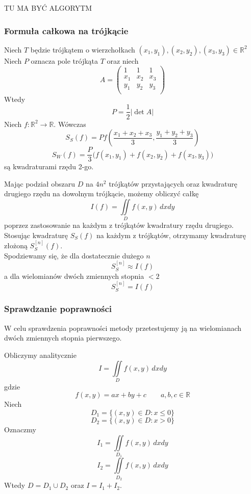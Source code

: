 \documentclass[9pt]{beamer}
\begin{document}
\begin{frame}
    TU MA BYĆ ALGORYTM
\end{frame}


\begin{frame}
    \frametitle{Formuła całkowa na trójkącie}
    Niech $T$ będzie trójkątem o wierzchołkach $(x_1,y_1), (x_2,y_2), (x_3,y_3) \in \mathbb{R}^2$
    Niech $P$ oznacza pole trójkąta $T$ oraz niech 
    $$ A = \begin{pmatrix}
    	1 & 1 & 1 \\
    	x_1 & x_2 & x_3 \\
    	y_1 & y_2 & y_3 \\
    \end{pmatrix} $$
    Wtedy $$P = \frac{1}{2}|\det{A}|$$
    Niech $f : \mathbb{R}^2 \to \mathbb{R}$. Wówczas 
    $$S_S(f) = P f \left(\frac{x_1+x_2+x_3}{3},\frac{y_1+y_2+y_3}{3} \right) $$
    $$S_W(f) = \frac{P}{3} \Big( f(x_1,y_1) + f(x_2,y_2) + f(x_3,y_3) \Big)$$
    są kwadraturami rzędu 2-go.
    
\end{frame}

\begin{frame}
	 \begin{spacing}{1.5}
	Mając podział obszaru $ D $ na $4 n^2 $ trójkątów przystających oraz kwadraturę drugiego rzędu na dowolnym trójkącie, możemy obliczyć całkę $$ I(f) = \iint\limits_D f(x,y)  \, dxdy $$ poprzez zastosowanie na każdym z trójkątów kwadratury rzędu drugiego.\\
	
	Stosując kwadraturę $ S_S(f) $ na każdym z trójkątów, 
	otrzymamy kwadraturę złożoną $ S_S^{[n]}(f) $.\\
	
	Spodziewamy się, że dla dostatecznie dużego $ n $
	$$ S_S^{[n]} \approx I(f) $$	
	a dla wielomianów dwóch zmiennych stopnia $ < 2 $
	$$ S_S^{[n]} = I(f) $$ 

	\end{spacing}
\end{frame}

\begin{frame}
\frametitle{Sprawdzanie poprawności}

    \begin{spacing}{1}
        W celu sprawdzenia poprawności metody przetestujemy ją na wielomianach dwóch zmiennych stopnia pierwszego.\par
        Obliczymy analitycznie 
        $$ I = \iint\limits_D f(x,y) \, dx dy $$ 
        gdzie
        $$ f(x,y) = ax + by + c \qquad a,b,c \in \mathbb{R}$$
        Niech 
        $$ D_1 = \{(x,y) \in D : x \leq 0\} $$ 
        $$ D_2 = \{(x,y) \in D : x > 0\} $$ 
        Oznaczmy 
        $$ I_1 = \iint\limits_{D_1} f(x,y) \, dx dy $$ 
        $$ I_2 = \iint\limits_{D_2} f(x,y) \, dx dy $$ 
        Wtedy $ D = D_1 \cup D_2 $ oraz $ I = I_1 + I_2 $.
    \end{spacing}

\end{frame}
\end{document}
